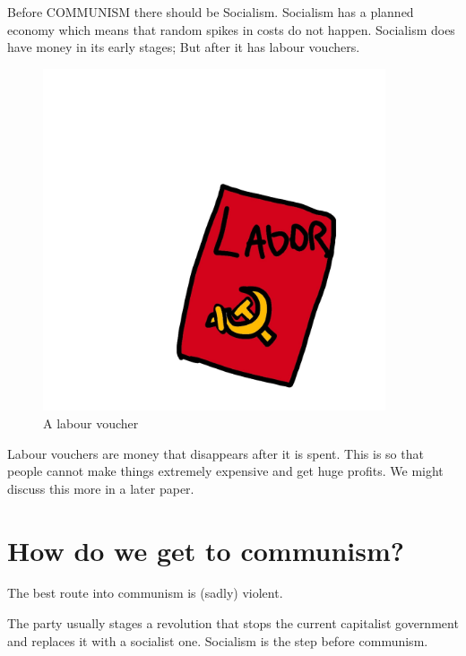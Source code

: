 \documentclass[a4paper]{book} %
\begin{document}
  Before COMMUNISM there should be Socialism. Socialism has a planned economy which means that random spikes in costs do not happen. Socialism does have money in its early stages; But after it has labour vouchers. 

\begin{figure}[tbhp]
\centering
\includegraphics[width=0.9\textwidth]{2-4.png}
\caption{A labour voucher}
\end{figure}

  Labour vouchers are money that disappears after it is spent. This is so that people cannot make things extremely expensive and get huge profits. We might discuss this more in a later paper.

\chapter{How do we get to communism?}

The best route into communism is (sadly) violent.

The party usually stages a revolution that stops the current capitalist government and replaces it with a socialist one. Socialism is the step before communism.
\end{document}
